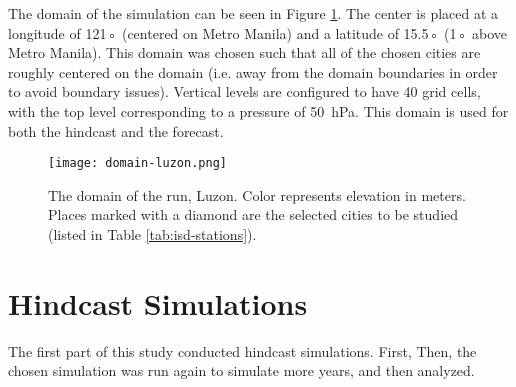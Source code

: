 		The domain of the simulation can be seen in Figure \ref{fig:domain-luzon}.
		The center is placed at a longitude of 121◦ (centered on Metro Manila) and a latitude of 15.5◦ (1◦ above Metro Manila).
		This domain was chosen such that all of the chosen cities are roughly centered on the domain (i.e. away from the domain boundaries in order to avoid boundary issues).
		Vertical levels are configured to have 40 grid cells, with the top level corresponding to a pressure of \qty{50}{hPa}.
		This domain is used for both the hindcast and the forecast.
		
		\begin{figure}
			\centering
			\texttt{[image: domain-luzon.png]}
			\caption{
				The domain of the run, Luzon.
				Color represents elevation in meters.
				Places marked with a diamond are the selected cities to be studied (listed in Table \ref{tab:isd-stations}).
			}
			\label{fig:domain-luzon}
		\end{figure}	
		
	
\section{Hindcast Simulations}
	The first part of this study conducted hindcast simulations.
	First, 
	Then, the chosen simulation was run again to simulate more years, and then analyzed.
	

